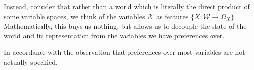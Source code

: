 \documentclass{article}
\begin{document}
	Instead, consider that rather than a world which is literally the direct product of some variable spaces, we think of the variables $\cal X$ as features $\{ X : \mathcal W \to \Omega_X \}$. Mathematically, this buys us nothing, but allows us to decouple the state of the world and its representation from the variables we have preferences over. 
	
	In accordance with the observation that preferences over most variables are not actually specified, 
	
	
	
	
	
	
	
\end{document}
